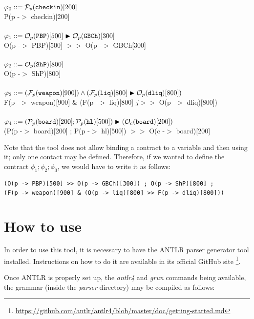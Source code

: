 \documentclass{article}
\begin{document}
\small
\noindent
    $\varphi_0 ::= {\mathcal{P}_{p}(\mathtt{checkin})}[200]$\\
    P(p -$>$ checkin)[200] \\
    \\
    $\varphi_1 ::= {\mathcal{O}_{p}(\mathtt{PBP})}[500]\blacktriangleright {\mathcal{O}_{p}(\ensuremath{\mathtt{GBCh}})}[300]$\\
    O(p -$>$ PBP)[500] $>>$ O(p -$>$ GBCh[300] \\
    \\
    $\varphi_2 ::= {\mathcal{O}_{p}(\mathtt{ShP})}[800]$\\
    O(p -$>$ ShP)[800] \\
    \\
    $\varphi_3  ::= 
        ({\mathcal{F}_{p}(\mathtt{weapon})}[900]) \wedge ({\mathcal{F}_{p}(\mathtt{liq})}[800] \blacktriangleright {\mathcal{O}_{p}(\ensuremath{\mathtt{dliq}})}[800])$\\
            F(p -$>$ weapon)[900] \& (F(p -$>$ liq)[800] $j>>$ O(p -$>$ dliq)[800]) \\
            \\
    $\varphi_4 ::= ({\mathcal{P}_{p}(\mathtt{board})}[200] ; {\mathcal{P}_{p}(\mathtt{hl})}[500]) \blacktriangleright ({\mathcal{O}_{c}(\mathtt{board})}[200])$ \\
    (P(p -$>$ board)[200] ; P(p -$>$ hl)[500]) $>>$ O(c -$>$ board)[200]
    \\
\normalsize

Note that the tool does not allow binding a contract to a variable and then using it; only one contact may be defined. Therefore, if we wanted to define the contract $\phi_1 ; \phi_2 ; \phi_3$, we would have to write it as follows:

\small

\begin{verbatim}
(O(p -> PBP)[500] >> O(p -> GBCh)[300]) ; O(p -> ShP)[800] ; 
(F(p -> weapon)[900] & (O(p -> liq)[800] >> F(p -> dliq)[800]))
\end{verbatim}

\normalsize

\section{How to use}
In order to use this tool, it is necessary to have the ANTLR parser generator tool installed. Instructions on how to do it are available in its official GitHub site \footnote{\url{https://github.com/antlr/antlr4/blob/master/doc/getting-started.md}}.

Once ANTLR is properly set up, the \textit{antlr4} and \textit{grun} commands being available, the grammar (inside the \textit{parser} directory) may be compiled as follows:
\end{document}
